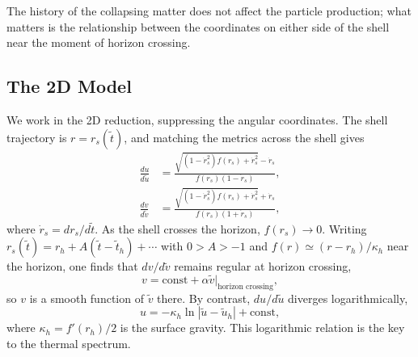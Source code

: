 
The history of the collapsing matter does not affect the particle
production; what matters is the relationship between the coordinates
on either side of the shell near the moment of horizon crossing.

\subsection*{The 2D Model}

We work in the 2D reduction, suppressing the angular coordinates. The
shell trajectory is $r = r_s(\tilde t)$, and matching the metrics
across the shell gives
\begin{align}
    \frac{du}{d\tilde u}
    &= \frac{\sqrt{(1-\dot r_s^2)f(r_s)+\dot r_s^2}-\dot r_s}
    {f(r_s)(1-\dot r_s)}, \\
    \frac{dv}{d\tilde v}
    &= \frac{\sqrt{(1-\dot r_s^2)f(r_s)+\dot r_s^2}+\dot r_s}
    {f(r_s)(1+\dot r_s)},
\end{align}
where $\dot r_s = dr_s/d\tilde t$. As the shell crosses the horizon,
$f(r_s)\to 0$. Writing $r_s(\tilde t) = r_h + A(\tilde t - \tilde t_h)
+ \cdots$ with $0 > A > -1$ and $f(r) \simeq (r-r_h)/\kappa_h$ near
the horizon, one finds that $dv/d\tilde v$ remains regular at horizon
crossing,
\begin{equation}
    v = \text{const} + \alpha\tilde v\big|_{\text{horizon crossing}},
\end{equation}
so $v$ is a smooth function of $\tilde v$ there. By contrast,
$du/d\tilde u$ diverges logarithmically,
\begin{equation}
    u = -\kappa_h\ln|\tilde u - \tilde u_h| + \text{const},
\end{equation}
where $\kappa_h = f'(r_h)/2$ is the surface gravity. This logarithmic
relation is the key to the thermal spectrum.

